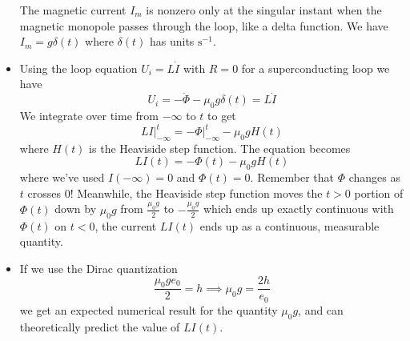 \documentclass[11pt, a4paper]{article}
\renewcommand{\vec}[1]{\bm{#1}} %
\newcommand{\mm}{\mu_{0}}  %
\newcommand{\m}{\vec{m}} %
\begin{document}
\begin{itemize}
	The magnetic current $ I_{m} $ is nonzero only at the singular instant when the magnetic monopole passes through the loop, like a delta function. We have $ I_{m} = g \delta (t) $ where $ \delta(t) $ has units $ \si{\second^{-1}} $. 
	
	\item Using the loop equation $ U_{i} = L \dot{I} $ with $ R = 0 $ for a superconducting loop we have
	\begin{equation*}
		U_{i} = - \dot{\Phi} - \mm g \delta (t) = L \dot{I}
	\end{equation*}
	We integrate over time from $ -\infty $ to $ t $ to get
	\begin{equation*}
		LI\big |_{-\infty}^{t} = - \Phi |_{-\infty}^{t} - \mm g H(t)
	\end{equation*}
	where $ H(t) $ is the Heaviside step function. The equation becomes
	\begin{equation*}
		LI(t) = - \Phi(t)  - \mm gH(t)
	\end{equation*}
	where we've used $ I(-\infty) = 0 $ and $ \Phi(t) = 0$. Remember that $ \Phi $ changes as $ t $ crosses $ 0 $! Meanwhile, the Heaviside step function moves the $ t > 0 $ portion of $ \Phi(t) $ down by $ \mm g $ from $ \frac{\mm g}{2} $ to $ -\frac{\mm g}{2} $ which ends up exactly continuous with $ \Phi(t) $ on $ t < 0 $, the current $ LI(t) $ ends up as a continuous, measurable quantity.
	
	\item If we use the Dirac quantization 
	\begin{equation*}
		\frac{\mm g e_{0}}{2} = h \implies \mm g = \frac{2h}{e_{0}}
	\end{equation*}
	we get an expected numerical result for the quantity $ \mm g $, and can theoretically predict the value of $ LI(t) $.
\end{itemize}
\end{document}
